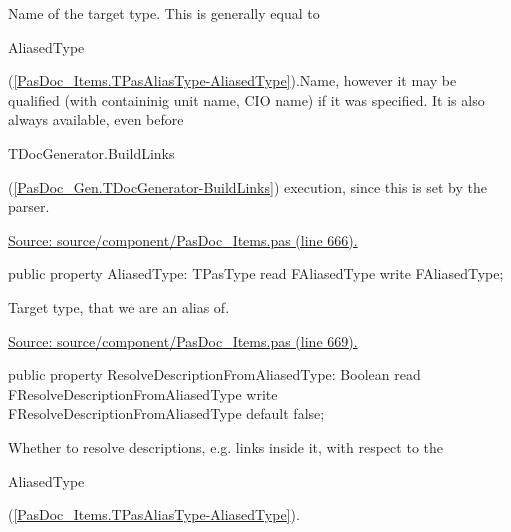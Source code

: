 \documentclass{report}
\newif\ifpdf
\begin{document}
\begin{list}{}
\begin{flushleft}
\ifpdf
\end{flushleft}
\fi


\par Name of the target type. This is generally equal to \begin{ttfamily}AliasedType\end{ttfamily}(\ref{PasDoc_Items.TPasAliasType-AliasedType}).Name, however it may be qualified (with containinig unit name, CIO name) if it was specified. It is also always available, even before \begin{ttfamily}TDocGenerator.BuildLinks\end{ttfamily}(\ref{PasDoc_Gen.TDocGenerator-BuildLinks}) execution, since this is set by the parser.\par
\href{https://github.com/pasdoc/pasdoc/blob/master/source/component/PasDoc_Items.pas#L666}{Source: source/component/PasDoc{\_}Items.pas (line 666).}\label{PasDoc_Items.TPasAliasType-AliasedType}
\item[\textbf{AliasedType}\hfill]
\ifpdf
\begin{flushleft}
\fi
\begin{ttfamily}
public property AliasedType: TPasType read FAliasedType write FAliasedType;\end{ttfamily}

\ifpdf
\end{flushleft}
\fi


\par Target type, that we are an alias of.\par
\href{https://github.com/pasdoc/pasdoc/blob/master/source/component/PasDoc_Items.pas#L669}{Source: source/component/PasDoc{\_}Items.pas (line 669).}\label{PasDoc_Items.TPasAliasType-ResolveDescriptionFromAliasedType}
\item[\textbf{ResolveDescriptionFromAliasedType}\hfill]
\ifpdf
\begin{flushleft}
\fi
\begin{ttfamily}
public property ResolveDescriptionFromAliasedType: Boolean
      read FResolveDescriptionFromAliasedType write FResolveDescriptionFromAliasedType
      default false;\end{ttfamily}

\ifpdf
\end{flushleft}
\fi


\par Whether to resolve descriptions, e.g. links inside it, with respect to the \begin{ttfamily}AliasedType\end{ttfamily}(\ref{PasDoc_Items.TPasAliasType-AliasedType}).\hfill\vspace*{1ex}


\end{list}
\end{document}
